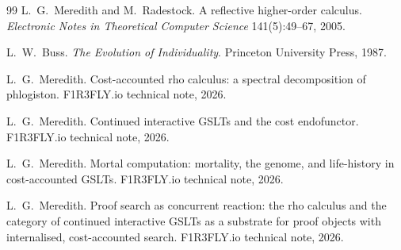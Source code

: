 \documentclass[11pt]{article}
\theoremstyle{definition}
\theoremstyle{plain}
\begin{document}
\begin{thebibliography}{99}
 L.~G.~Meredith and M.~Radestock.
\newblock A reflective higher-order calculus.
\newblock \emph{Electronic Notes in Theoretical Computer Science} 141(5):49--67,
2005.

 L.~W.~Buss.
\newblock \emph{The Evolution of Individuality}.
\newblock Princeton University Press, 1987.

 L.~G.~Meredith.
\newblock Cost-accounted rho calculus: a spectral decomposition of phlogiston.
\newblock F1R3FLY.io technical note, 2026.

 L.~G.~Meredith.
\newblock Continued interactive GSLTs and the cost endofunctor.
\newblock F1R3FLY.io technical note, 2026.

 L.~G.~Meredith.
\newblock Mortal computation: mortality, the genome, and life-history in
cost-accounted GSLTs.
\newblock F1R3FLY.io technical note, 2026.

 L.~G.~Meredith.
\newblock Proof search as concurrent reaction: the rho calculus and the category
of continued interactive GSLTs as a substrate for proof objects with
internalised, cost-accounted search.
\newblock F1R3FLY.io technical note, 2026.

\end{thebibliography}
\end{document}
